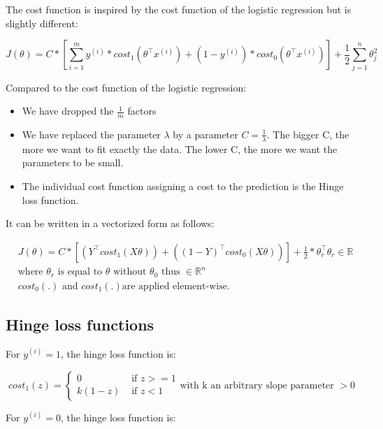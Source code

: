 \documentclass[a4paper, 12pt]{article}
\begin{document}
The cost function is inspired by the cost function of the logistic regression but is slightly different:

\begin{equation}
J(\theta) = C * \left[ \sum_{i=1}^{m} y^{(i)} * cost_1(\theta^{\top}x^{(i)}) + (1-y^{(i)})*cost_0(\theta^{\top}x^{(i)}) \right] + \frac{1}{2} \sum_{j=1}^{n} \theta_{j}^{2}
\end{equation}

Compared to the cost function of the logistic regression:

\begin{itemize}
\item We have dropped the $\frac{1}{m}$ factors
\item We have replaced the parameter $\lambda$ by a parameter $C = \frac{1}{\lambda}$. The bigger C, the more we want to fit exactly the data. The lower C, the more we want the parameters to be small.
\item The individual cost function assigning a cost to the prediction is the Hinge loss function.
\end{itemize}

It can be written in a vectorized form as follows:

\begin{align*}
& J(\theta) = C * \left[ (Y^{\top}cost_1(X\theta)) + ({(1-Y)}^{\top}cost_0(X\theta)) \right] + \frac{1}{2}*\theta_{r}^{\top}\theta_{r} \in \mathbb{R} \\
& \text{where } \theta_{r} \text{ is equal to } \theta \text{ without } \theta_0 \text{ thus } \in \mathbb{R}^{n} \\
& cost_0(.) \text{ and } cost_1(.) \text{are applied element-wise}.
\end{align*}

\subsection{Hinge loss functions}

For $y^{(i)}=1$, the hinge loss function is:

\begin{equation}
cost_1(z) = 
\begin{cases}
0 & \text{ if } z >= 1 \\
k(1-z) &  \text{ if } z<1
\end{cases}
\text{with k an arbitrary slope parameter } >0
\end{equation}

For $y^{(i)}=0$, the hinge loss function is:
\end{document}

